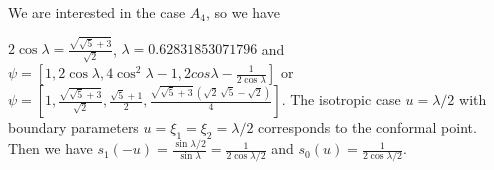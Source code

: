 \documentclass[12pt]{article}
\begin{document}





  We are interested in the case $A_4$, so we have

$2\cos\lambda=\frac{\sqrt{\sqrt{5}+3}}{\sqrt{2}}$,
$\lambda=0.62831853071796$ and $\psi=\left[1,2\cos\lambda,
  4\cos^2\lambda-1, 2cos\lambda-\frac{1}{2\cos\lambda}\right]$ or $\psi=\left[1,\frac{\sqrt{\sqrt{5}+3}}{\sqrt{2}},\frac{\sqrt{5}+1}{2},\frac{\sqrt{\sqrt{5}+3}\,\left( \sqrt{2}\,\sqrt{5}-\sqrt{2}\right) }{4}\right]$.
The isotropic case $u=\lambda/2$ with boundary parameters
$u=\xi_1=\xi_2=\lambda/2$ corresponds to the  conformal point. Then we have
$s_1(-u)=\frac{\sin\lambda/2}{\sin\lambda}=\frac{1}{2\cos\lambda/2}$ and $s_0(u)=\frac{1}{2\cos\lambda/2}$.
\end{document}
